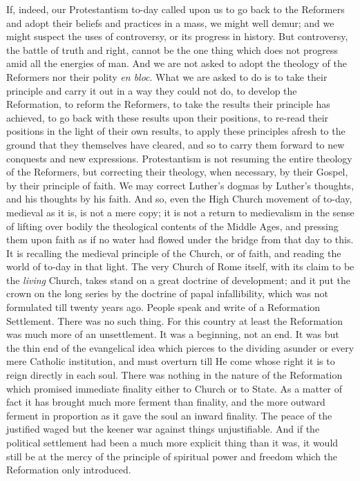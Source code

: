 \documentclass[12pt,a5paper,oneside]{book}
\begin{document}
If, indeed, our Protestantism to-day called upon us 
to go back to the Reformers and adopt their beliefs 
and practices in a mass, we might well demur; and 
we might suspect the uses of controversy, or its progress 
in history. But controversy, the battle of truth 
and right, cannot be the one thing which does not 
progress amid all the energies of man. And we are 
not asked to adopt the theology of the Reformers nor 
their polity \textit{en bloc}. What we are asked to do is to 
take their principle and carry it out in a way they 
could not do, to develop the Reformation, to reform 
the Reformers, to take the results their principle has 
achieved, to go back with these results upon their 
positions, to re-read their positions in the light of 
their own results, to apply these principles afresh to 
the ground that they themselves have cleared, and 
so to carry them forward to new conquests and new 
expressions. Protestantism is not resuming the entire 
theology of the Reformers, but correcting their theology, 
when necessary, by their Gospel, by their 
principle of faith. We may correct Luther's dogmas 
by Luther's thoughts, and his thoughts by his faith. 
And so, even the High Church movement of to-day, 
medieval as it is, is not a mere copy; it is not a return 
to medievalism in the sense of lifting over bodily the 
theological contents of the Middle Ages, and pressing 
them upon faith as if no water had flowed under 
the bridge from that day to this. It is recalling the 
medieval principle of the Church, or of faith, and 
reading the world of to-day in that light. The very 
Church of Rome itself, with its claim to be the \textit{living} 
Church, takes stand on a great doctrine of development; 
and it put the crown on the long series by 
the doctrine of papal infallibility, which was not 
formulated till twenty years ago. People speak and 
write of a Reformation Settlement. There was no 
such thing. For this country at least the Reformation 
was much more of an unsettlement. It was a 
beginning, not an end. It was but the thin end of 
the evangelical idea which pierces to the dividing 
asunder or every mere Catholic institution, and must 
overturn till He come whose right it is to reign 
directly in each soul. There was nothing in the 
nature of the Reformation which promised immediate 
finality either to Church or to State. As a matter 
of fact it has brought much more ferment than 
finality, and the more outward ferment in proportion 
as it gave the soul an inward finality. The 
peace of the justified waged but the keener war 
against things unjustifiable. And if the political settlement 
had been a much more explicit thing than it 
was, it would still be at the mercy of the principle 
of spiritual power and freedom which the Reformation 
only introduced. 
\end{document}
